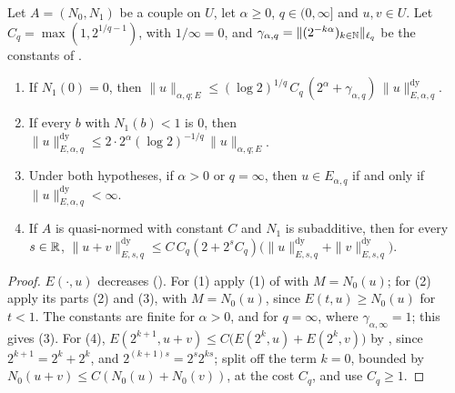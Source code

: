\begin{lemma}
\label{lem:e-method-dyadic}
\leanok
{}
Let $A = (N_0, N_1)$ be a couple on $U$, let $\alpha \geq 0$, $q \in (0, \infty]$ and
$u, v \in U$. Let $C_q = \max(1, 2^{1/q - 1})$, with $1/\infty = 0$, and
$\gamma_{\alpha, q} = \|(2^{-k\alpha})_{k \in \mathbb{N}}\|_{\ell_q}$ be the constants of
.
\begin{enumerate}
  \item If $N_1(0) = 0$, then $\|u\|_{\alpha, q; E} \leq (\log 2)^{1/q} \, C_q \,
    (2^\alpha + \gamma_{\alpha, q}) \, \|u\|^{\mathrm{dy}}_{E, \alpha, q}$.
  \item If every $b$ with $N_1(b) < 1$ is $0$, then
    $\|u\|^{\mathrm{dy}}_{E, \alpha, q} \leq 2 \cdot 2^\alpha (\log 2)^{-1/q} \,
    \|u\|_{\alpha, q; E}$.
  \item Under both hypotheses, if $\alpha > 0$ or $q = \infty$, then $u \in E_{\alpha, q}$ if and
    only if $\|u\|^{\mathrm{dy}}_{E, \alpha, q} < \infty$.
  \item If $A$ is quasi-normed with constant $C$ and $N_1$ is subadditive, then for every
    $s \in \mathbb{R}$,
    $\|u + v\|^{\mathrm{dy}}_{E, s, q} \leq C \, C_q (2 + 2^s C_q) \bigl(
    \|u\|^{\mathrm{dy}}_{E, s, q} + \|v\|^{\mathrm{dy}}_{E, s, q}\bigr)$.
\end{enumerate}
\end{lemma}

\begin{proof}
\leanok
$E(\cdot, u)$ decreases (). For (1) apply (1) of
 with $M = N_0(u)$; for (2) apply its parts (2) and (3), with
$M = N_0(u)$, since $E(t, u) \geq N_0(u)$ for $t < 1$. The constants are finite for
$\alpha > 0$, and for $q = \infty$, where $\gamma_{\alpha, \infty} = 1$; this gives (3). For (4),
$E(2^{k+1}, u + v) \leq C \bigl(E(2^k, u) + E(2^k, v)\bigr)$ by , since
$2^{k+1} = 2^k + 2^k$, and
$2^{(k+1)s} = 2^s 2^{ks}$; split off the term $k = 0$, bounded by $N_0(u + v) \leq C (N_0(u) +
N_0(v))$, at the cost $C_q$, and use $C_q \geq 1$.
\end{proof}

